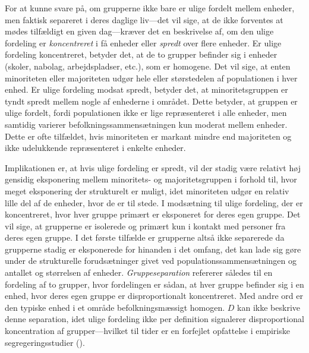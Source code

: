 \documentclass[
]{book}
\begin{document}
For at kunne svare på, om grupperne ikke bare er ulige fordelt mellem enheder, men faktisk separeret i deres daglige liv---det vil sige, at de ikke forventes at mødes tilfældigt en given dag---kræver det en beskrivelse af, om den ulige fordeling er \emph{koncentreret} i få enheder eller \emph{spredt} over flere enheder. Er ulige fordeling koncentreret, betyder det, at de to grupper befinder sig i enheder (skoler, nabolag, arbejdspladser, etc.), som er homogene. Det vil sige, at enten minoriteten eller majoriteten udgør hele eller størstedelen af populationen i hver enhed. Er ulige fordeling modsat spredt, betyder det, at minoritetsgruppen er tyndt spredt mellem nogle af enhederne i området. Dette betyder, at gruppen er ulige fordelt, fordi populationen ikke er lige repræsenteret i alle enheder, men samtidig varierer befolkningssammensætningen kun moderat mellem enheder. Dette er ofte tilfældet, hvis minoriteten er markant mindre end majoriteten og ikke udelukkende repræsenteret i enkelte enheder.

Implikationen er, at hvis ulige fordeling er spredt, vil der stadig være relativt høj gensidig eksponering mellem minoritets- og majoritetsgruppen i forhold til, hvor meget eksponering der strukturelt er muligt, idet minoriteten udgør en relativ lille del af de enheder, hvor de er til stede. I modsætning til ulige fordeling, der er koncentreret, hvor hver gruppe primært er eksponeret for deres egen gruppe. Det vil sige, at grupperne er isolerede og primært kun i kontakt med personer fra deres egen gruppe. I det første tilfælde er grupperne altså ikke separerede da grupperne stadig er eksponerede for hinanden i det omfang, det kan lade sig gøre under de strukturelle forudsætninger givet ved populationssammensætningen og antallet og størrelsen af enheder. \emph{Gruppeseparation} refererer således til en fordeling af to grupper, hvor fordelingen er sådan, at hver gruppe befinder sig i en enhed, hvor deres egen gruppe er disproportionalt koncentreret. Med andre ord er den typiske enhed i et område befolkningsmæssigt homogen. \(D\) kan ikke beskrive denne separation, idet ulige fordeling ikke per definition signalerer disproportional koncentration af grupper---hvilket til tider er en forfejlet opfattelse i empiriske segregeringsstudier ().
\end{document}
